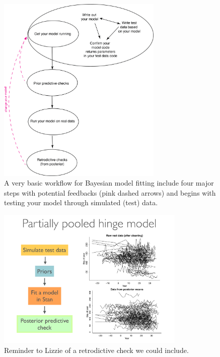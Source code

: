 \documentclass[11pt]{article}
\begin{document}
\begin{figure}[ht]
\centering
\noindent \includegraphics[width=0.7\textwidth]{figures/workflow.png}
\caption{A very basic workflow for Bayesian model fitting include four major steps with potential feedbacks (pink dashed arrows) and begins with testing your model through simulated (test) data.}
\label{fig:workflow}
\end{figure}

\begin{figure}[ht]
\centering
\noindent \includegraphics[width=0.8\textwidth]{figures/Pages_from_generablestannyc.pdf}
\caption{Reminder to Lizzie of a retrodictive check we could include.}
\label{fig:retrodictivecheck}
\end{figure}
\end{document}
